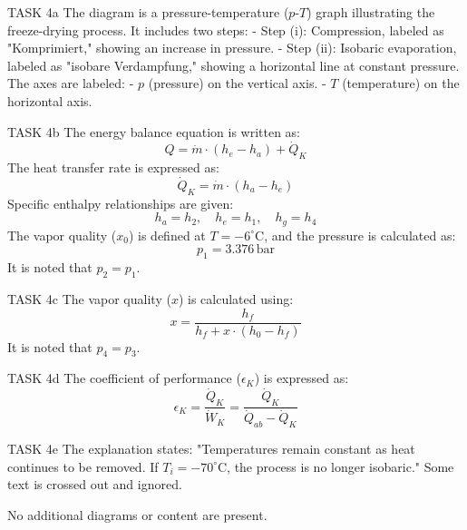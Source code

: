 TASK 4a  
The diagram is a pressure-temperature (\(p\)-\(T\)) graph illustrating the freeze-drying process. It includes two steps:  
- Step (i): Compression, labeled as "Komprimiert," showing an increase in pressure.  
- Step (ii): Isobaric evaporation, labeled as "isobare Verdampfung," showing a horizontal line at constant pressure.  
The axes are labeled:  
- \(p\) (pressure) on the vertical axis.  
- \(T\) (temperature) on the horizontal axis.  

TASK 4b  
The energy balance equation is written as:  
\[
Q = \dot{m} \cdot \left(h_e - h_a\right) + \dot{Q}_K
\]  
The heat transfer rate is expressed as:  
\[
\dot{Q}_K = \dot{m} \cdot \left(h_a - h_e\right)
\]  
Specific enthalpy relationships are given:  
\[
h_a = h_2, \quad h_e = h_1, \quad h_g = h_4
\]  
The vapor quality (\(x_0\)) is defined at \(T = -6^\circ\text{C}\), and the pressure is calculated as:  
\[
p_1 = 3.376 \, \text{bar}
\]  
It is noted that \(p_2 = p_1\).  

TASK 4c  
The vapor quality (\(x\)) is calculated using:  
\[
x = \frac{h_f}{h_f + x \cdot \left(h_0 - h_f\right)}
\]  
It is noted that \(p_4 = p_3\).  

TASK 4d  
The coefficient of performance (\(\epsilon_K\)) is expressed as:  
\[
\epsilon_K = \frac{\dot{Q}_K}{\dot{W}_K} = \frac{\dot{Q}_K}{\dot{Q}_{ab} - \dot{Q}_K}
\]  

TASK 4e  
The explanation states:  
"Temperatures remain constant as heat continues to be removed. If \(T_i = -70^\circ\text{C}\), the process is no longer isobaric."  
Some text is crossed out and ignored.  

No additional diagrams or content are present.